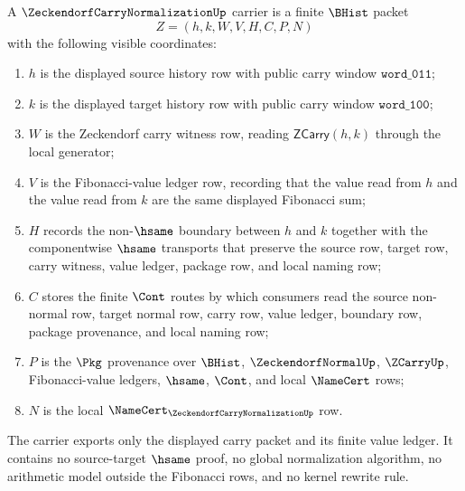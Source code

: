 \begin{definition}
\label{def:zeckendorf-carry-normalization-carrier}
A $\ZeckendorfCarryNormalizationUp$ carrier is a finite $\BHist$ packet
$$
Z=(h,k,W,V,H,C,P,N)
$$
with the following visible coordinates:
\begin{enumerate}
\item $h$ is the displayed source history row with public carry window
$\mathtt{word\_011}$;
\item $k$ is the displayed target history row with public carry window
$\mathtt{word\_100}$;
\item $W$ is the Zeckendorf carry witness row, reading
$\mathsf{ZCarry}(h,k)$ through the local generator;
\item $V$ is the Fibonacci-value ledger row, recording that the value read
from $h$ and the value read from $k$ are the same displayed Fibonacci sum;
\item $H$ records the non-$\hsame$ boundary between $h$ and $k$ together with
the componentwise $\hsame$ transports that preserve the source row, target
row, carry witness, value ledger, package row, and local naming row;
\item $C$ stores the finite $\Cont$ routes by which consumers read the source
non-normal row, target normal row, carry row, value ledger, boundary row,
package provenance, and local naming row;
\item $P$ is the $\Pkg$ provenance over $\BHist$, $\ZeckendorfNormalUp$,
$\ZCarryUp$, Fibonacci-value ledgers, $\hsame$, $\Cont$, and local
$\NameCert$ rows;
\item $N$ is the local
$\NameCert_{\ZeckendorfCarryNormalizationUp}$ row.
\end{enumerate}
The carrier exports only the displayed carry packet and its finite value
ledger. It contains no source-target $\hsame$ proof, no global normalization
algorithm, no arithmetic model outside the Fibonacci rows, and no kernel
rewrite rule.
\end{definition}

